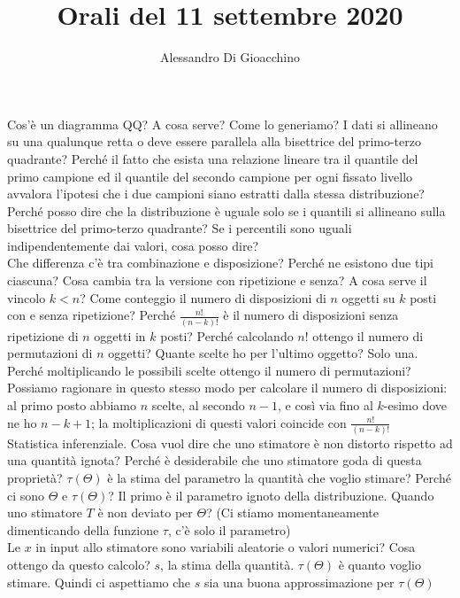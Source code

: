\documentclass{article}
\title{Orali del 11 settembre 2020}
\author{Alessandro Di Gioacchino}
\begin{document}
    \maketitle
    
    Cos'è un diagramma QQ? A cosa serve? Come lo generiamo? I dati si allineano su una qualunque retta o deve essere parallela alla bisettrice del primo-terzo quadrante?
    Perché il fatto che esista una relazione lineare tra il quantile del primo campione ed il quantile del secondo campione per ogni fissato livello avvalora l'ipotesi che i
    due campioni siano estratti dalla stessa distribuzione? Perché posso dire che la distribuzione è uguale solo se i quantili si allineano sulla bisettrice del primo-terzo
    quadrante? Se i percentili sono uguali indipendentemente dai valori, cosa posso dire? \\
    Che differenza c'è tra combinazione e disposizione? Perché ne esistono due tipi ciascuna? Cosa cambia tra la versione con ripetizione e senza? A cosa serve il vincolo
    $ k < n $? Come conteggio il numero di disposizioni di $ n $ oggetti su $ k $ posti con e senza ripetizione? Perché $ \frac{ n! }{( n - k )! } $ è il numero di
    disposizioni senza ripetizione di $ n $ oggetti in $ k $ posti? Perché calcolando $ n! $ ottengo il numero di permutazioni di $ n $ oggetti? Quante scelte ho per l'ultimo
    oggetto? Solo una. Perché moltiplicando le possibili scelte ottengo il numero di permutazioni? Possiamo ragionare in questo stesso modo per calcolare il numero di
    disposizioni: al primo posto abbiamo $ n $ scelte, al secondo $ n - 1 $, e così via fino al $ k $-esimo dove ne ho $ n - k + 1 $; la moltiplicazioni di questi valori
    coincide con $ \frac{ n! }{( n - k )! } $ \\
    Statistica inferenziale. Cosa vuol dire che uno stimatore è non distorto rispetto ad una quantità ignota? Perché è desiderabile che uno stimatore goda di questa proprietà?
    $ \tau ( \Theta ) $ è la stima del parametro la quantità che voglio stimare? Perché ci sono $ \Theta $ e $ \tau ( \Theta ) $? Il primo è il parametro ignoto della 
    distribuzione. Quando uno stimatore $ T $ è non deviato per $ \Theta $? (Ci stiamo momentaneamente dimenticando della funzione $ \tau $, c'è solo il parametro) \\
    Le $ x $ in input allo stimatore sono variabili aleatorie o valori numerici? Cosa ottengo da questo calcolo? $ s $, la stima della quantità. $ \tau ( \Theta ) $ è quanto
    voglio stimare. Quindi ci aspettiamo che $ s $ sia una buona approssimazione per $ \tau ( \Theta ) $ \\
    
\end{document}
